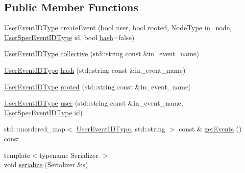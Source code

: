 \subsection*{Public Member Functions}
\begin{DoxyCompactItemize}
\item 
\hyperlink{namespacevt_1_1trace_a5908920d051c144c89f17c69ed262350}{User\+Event\+I\+D\+Type} \hyperlink{structvt_1_1trace_1_1_user_event_registry_ac219431476480a6c9fe10ede067b33d2}{create\+Event} (bool \hyperlink{structvt_1_1trace_1_1_user_event_registry_a6a2156b87f22007a4a20ca1b7e96d2fe}{user}, bool \hyperlink{structvt_1_1trace_1_1_user_event_registry_a8b940e39914a9d3ba1acf0a219f6d44d}{rooted}, \hyperlink{namespacevt_a866da9d0efc19c0a1ce79e9e492f47e2}{Node\+Type} in\+\_\+node, \hyperlink{namespacevt_1_1trace_a70c43e0e1596eea236912d4197d3120a}{User\+Spec\+Event\+I\+D\+Type} id, bool \hyperlink{structvt_1_1trace_1_1_user_event_registry_a99ef8a7f7df7a11fac6ada816f83cfbf}{hash}=false)
\item 
\hyperlink{namespacevt_1_1trace_a5908920d051c144c89f17c69ed262350}{User\+Event\+I\+D\+Type} \hyperlink{structvt_1_1trace_1_1_user_event_registry_a351d80d6d91bcd47e9fff0f6ed18df4d}{collective} (std\+::string const \&in\+\_\+event\+\_\+name)
\item 
\hyperlink{namespacevt_1_1trace_a5908920d051c144c89f17c69ed262350}{User\+Event\+I\+D\+Type} \hyperlink{structvt_1_1trace_1_1_user_event_registry_a99ef8a7f7df7a11fac6ada816f83cfbf}{hash} (std\+::string const \&in\+\_\+event\+\_\+name)
\item 
\hyperlink{namespacevt_1_1trace_a5908920d051c144c89f17c69ed262350}{User\+Event\+I\+D\+Type} \hyperlink{structvt_1_1trace_1_1_user_event_registry_a8b940e39914a9d3ba1acf0a219f6d44d}{rooted} (std\+::string const \&in\+\_\+event\+\_\+name)
\item 
\hyperlink{namespacevt_1_1trace_a5908920d051c144c89f17c69ed262350}{User\+Event\+I\+D\+Type} \hyperlink{structvt_1_1trace_1_1_user_event_registry_a6a2156b87f22007a4a20ca1b7e96d2fe}{user} (std\+::string const \&in\+\_\+event\+\_\+name, \hyperlink{namespacevt_1_1trace_a70c43e0e1596eea236912d4197d3120a}{User\+Spec\+Event\+I\+D\+Type} id)
\item 
std\+::unordered\+\_\+map$<$ \hyperlink{namespacevt_1_1trace_a5908920d051c144c89f17c69ed262350}{User\+Event\+I\+D\+Type}, std\+::string $>$ const  \& \hyperlink{structvt_1_1trace_1_1_user_event_registry_aaa8cbfc8f3596bb5f9aa97cccd72f890}{get\+Events} () const
\item 
{\footnotesize template$<$typename Serializer $>$ }\\void \hyperlink{structvt_1_1trace_1_1_user_event_registry_ae2ab385a6ce4a4b0c2afd1a408ba7f6e}{serialize} (Serializer \&s)
\end{DoxyCompactItemize}

